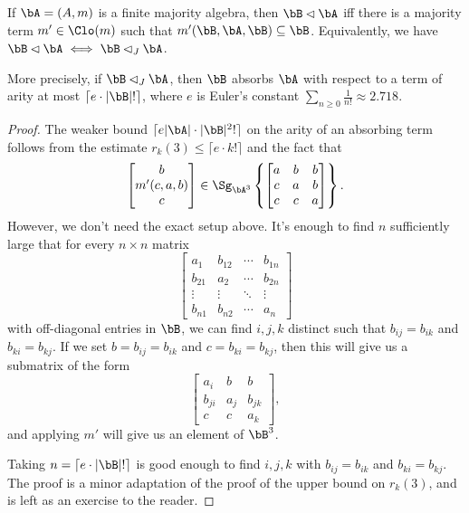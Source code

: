 \begin{cor} If $\bA = (A,m)$ is a finite majority algebra, then $\bB \lhd \bA$ iff there is a majority term $m' \in \Clo(m)$ such that $m'(\bB,\bA,\bB) \subseteq \bB$. Equivalently, we have $\bB \lhd \bA \iff \bB \lhd_J \bA$.

More precisely, if $\bB \lhd_J \bA$, then $\bB$ absorbs $\bA$ with respect to a term of arity at most $\lceil e\cdot |\bB|!\rceil$, where $e$ is Euler's constant $\sum_{n \ge 0} \frac{1}{n!} \approx 2.718$.
\end{cor}
\begin{proof} The weaker bound $\lceil e|\bA|\cdot |\bB|^2!\rceil$ on the arity of an absorbing term follows from the estimate $r_k(3) \le \lceil e\cdot k!\rceil$ and the fact that
\[
\begin{bmatrix}b\\ m'(c,a,b)\\ c\end{bmatrix} \in \Sg_{\bA^3}\left\{\begin{bmatrix} a & b & b\\ c & a & b\\ c & c & a\end{bmatrix}\right\}.
\]
However, we don't need the exact setup above. It's enough to find $n$ sufficiently large that for every $n\times n$ matrix
\[
\begin{bmatrix} a_1 & b_{12} & \cdots & b_{1n}\\ b_{21} & a_2 & \cdots & b_{2n}\\ \vdots & \vdots & \ddots & \vdots\\ b_{n1} & b_{n2} & \cdots & a_n\end{bmatrix}
\]
with off-diagonal entries in $\bB$, we can find $i,j,k$ distinct such that $b_{ij} = b_{ik}$ and $b_{ki} = b_{kj}$. If we set $b = b_{ij} = b_{ik}$ and $c = b_{ki} = b_{kj}$, then this will give us a submatrix of the form
\[
\begin{bmatrix} a_i & b & b\\ b_{ji} & a_j & b_{jk}\\ c & c & a_k\end{bmatrix},
\]
and applying $m'$ will give us an element of $\bB^3$.

Taking $n = \lceil e\cdot |\bB|!\rceil$ is good enough to find $i,j,k$ with $b_{ij} = b_{ik}$ and $b_{ki} = b_{kj}$. The proof is a minor adaptation of the proof of the upper bound on $r_k(3)$, and is left as an exercise to the reader.
\end{proof}

